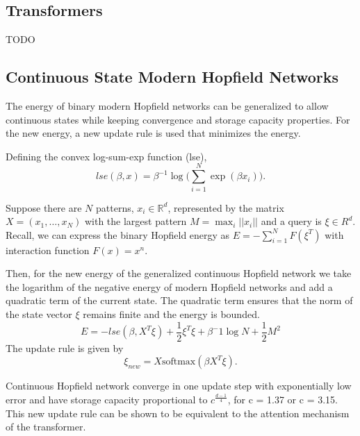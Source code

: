 \documentclass{article}
\begin{document}
\subsection{Transformers}
TODO

\subsection{Continuous State Modern Hopfield Networks}

The energy of binary modern Hopfield networks can be generalized to allow continuous
states while keeping convergence and storage capacity properties. For the new energy, a new update rule is used that minimizes the energy. 

Defining the convex log-sum-exp function (lse),
\[
    lse(\beta, x) = \beta^{-1} \log \bigg (  \sum_{i=1}^{N} \exp(\beta x_i) \bigg).
\]

Suppose there are $N$ patterns, $x_i \in \mathbb R^d$, represented by the matrix $X = (x_1, \dots, x_N)$ with the largest pattern $M = \max_i ||x_i||$ and a query is $\xi \in R^d$. Recall, we can express the binary Hopfield energy as $E = -\sum_{i=1}^N F(\xi^T)$  with interaction function $F(x) = x^n$.

Then, for the new energy of the generalized continuous Hopfield network we take the logarithm of the negative energy of modern Hopfield networks and add a quadratic term of the current state. The quadratic term ensures that the norm of the state vector $\xi$ remains finite and the energy is bounded.
\[
    E = -lse(\beta, X^T \xi) + \frac{1}{2}\xi^T\xi + \beta^-1\log N +\frac{1}{2} M^2
\]
The update rule is given by
\[
    \xi_{new} = X \text{softmax}(\beta X^T \xi).
\]

Continuous Hopfield network converge in one update step with exponentially low error and have storage capacity proportional to $c^{\frac{d-1}{4}}$,  for c = 1.37 or c = 3.15. This new update rule can be shown to be equivalent to the attention mechanism of the transformer.



\end{document}
